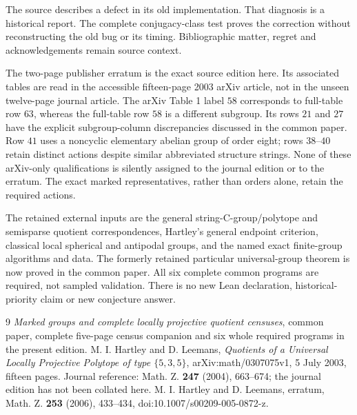 \documentclass[11pt,a4paper]{article}
\begin{document}
The source describes a defect in its old implementation. That diagnosis is a historical report. The complete conjugacy-class test proves the correction without reconstructing the old bug or its timing. Bibliographic matter, regret and acknowledgements remain source context.

The two-page publisher erratum is the exact source edition here. Its associated tables are read in the accessible fifteen-page 2003 arXiv article, not in the unseen twelve-page journal article. The arXiv Table 1 label $58$ corresponds to full-table row $63$, whereas the full-table row $58$ is a different subgroup. Its rows $21$ and $27$ have the explicit subgroup-column discrepancies discussed in the common paper. Row $41$ uses a noncyclic elementary abelian group of order eight; rows $38$--$40$ retain distinct actions despite similar abbreviated structure strings. None of these arXiv-only qualifications is silently assigned to the journal edition or to the erratum. The exact marked representatives, rather than orders alone, retain the required actions.

The retained external inputs are the general string-C-group/polytope and semisparse quotient correspondences, Hartley's general endpoint criterion, classical local spherical and antipodal groups, and the named exact finite-group algorithms and data. The formerly retained particular universal-group theorem is now proved in the common paper. All six complete common programs are required, not sampled validation. There is no new Lean declaration, historical-priority claim or new conjecture answer.
\begin{thebibliography}{9}
 \emph{Marked groups and complete locally projective quotient censuses}, common paper, complete five-page census companion and six whole required programs in the present edition.
 M. I. Hartley and D. Leemans, \emph{Quotients of a Universal Locally Projective Polytope of type $\{5,3,5\}$}, arXiv:math/0307075v1, 5 July 2003, fifteen pages. Journal reference: Math. Z. \textbf{247} (2004), 663--674; the journal edition has not been collated here.
 M. I. Hartley and D. Leemans, erratum, Math. Z. \textbf{253} (2006), 433--434, doi:10.1007/s00209-005-0872-z.
\end{thebibliography}
\end{document}
